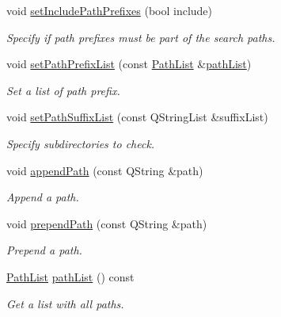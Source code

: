 \begin{DoxyCompactItemize}
\item 
void \hyperlink{class_mdt_1_1_deploy_utils_1_1_search_path_list_a3f10eadc3981b72ac9d2efc54484fa9a}{set\+Include\+Path\+Prefixes} (bool include)
\begin{DoxyCompactList}\small\item\em Specify if path prefixes must be part of the search paths. \end{DoxyCompactList}\item 
void \hyperlink{class_mdt_1_1_deploy_utils_1_1_search_path_list_ab850ca5b09572c85f38d9a2b0d56608b}{set\+Path\+Prefix\+List} (const \hyperlink{class_mdt_1_1_deploy_utils_1_1_path_list}{Path\+List} \&\hyperlink{class_mdt_1_1_deploy_utils_1_1_search_path_list_aa7c7f8f31e4ce1aaabdcdd03eb8f1256}{path\+List})
\begin{DoxyCompactList}\small\item\em Set a list of path prefix. \end{DoxyCompactList}\item 
void \hyperlink{class_mdt_1_1_deploy_utils_1_1_search_path_list_a80e2b88c150cf3916871845d041566f1}{set\+Path\+Suffix\+List} (const Q\+String\+List \&suffix\+List)
\begin{DoxyCompactList}\small\item\em Specify subdirectories to check. \end{DoxyCompactList}\item 
void \hyperlink{class_mdt_1_1_deploy_utils_1_1_search_path_list_ad06c34f840769dc0ba75fd3c3442ecbf}{append\+Path} (const Q\+String \&path)
\begin{DoxyCompactList}\small\item\em Append a path. \end{DoxyCompactList}\item 
void \hyperlink{class_mdt_1_1_deploy_utils_1_1_search_path_list_a09e1456243ac5616681d201f4fbbe1c1}{prepend\+Path} (const Q\+String \&path)
\begin{DoxyCompactList}\small\item\em Prepend a path. \end{DoxyCompactList}\item 
\hyperlink{class_mdt_1_1_deploy_utils_1_1_path_list}{Path\+List} \hyperlink{class_mdt_1_1_deploy_utils_1_1_search_path_list_aa7c7f8f31e4ce1aaabdcdd03eb8f1256}{path\+List} () const 
\begin{DoxyCompactList}\small\item\em Get a list with all paths. \end{DoxyCompactList}\item 

\end{DoxyCompactItemize}
